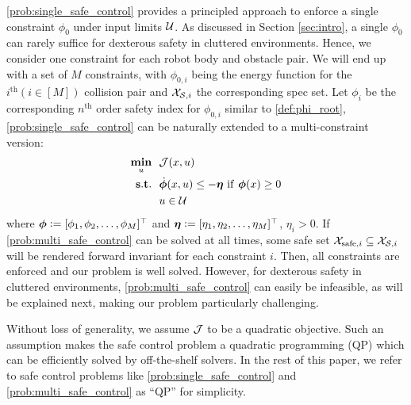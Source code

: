 \eqref{prob:single_safe_control} provides a principled approach to enforce a single constraint $\phi_0$ under input limits $\mathcal{U}$.
As discussed in Section \ref{sec:intro}, a single $\phi_0$ can rarely suffice for dexterous safety in cluttered environments.
Hence, we consider one constraint for each robot body and obstacle pair.
We will end up with a set of $M$ constraints, with $\phi_{0,i}$ being the energy function for the $i^\mathrm{th} (i\in[M])$ collision pair and $\mathcal{X}_{{\mathcal{S}},i}$ the corresponding spec set.
Let $\phi_i$ be the corresponding $n^\mathrm{th}$ order safety index for $\phi_{0,i}$ similar to \eqref{def:phi_root}, \eqref{prob:single_safe_control}
can be naturally extended to a multi-constraint version:
\begin{subequations}\label{prob:multi_safe_control}
\begin{align}
\mathop{\underset{{u}}{\mathop{\mathbf{min}}}}~~ & \mathcal{J}(x,u)  \\
\mathop{\mathbf{s.t.}}~~ & \dot{\bm{\phi}}(x,u) \leq -\bm{\eta}~\mathrm{if}~\bm{\phi}(x) \geq 0  \label{eq:multi_safe_control_phi_constr} \\ 
& u\in\mathcal{U} \label{eq:multi_safe_control_contol_limit}
\end{align}
\end{subequations}
where $\bm{\phi}\vcentcolon=[\phi_1,\phi_2,\dots,\phi_M]^\top$ and $\bm{\eta}\vcentcolon= [\eta_1, \eta_2, \dots, \eta_M]^\top$, $\eta_i > 0$.
If \eqref{prob:multi_safe_control} can be solved at all times, some safe set $\mathcal{X}_{\mathrm{safe},i}\subseteq\mathcal{X}_{{\mathcal{S}},i}$ will be rendered forward invariant for each constraint $i$.
Then, all constraints are enforced and our problem is well solved.
However, for dexterous safety in cluttered environments, \eqref{prob:multi_safe_control} can easily be infeasible, as will be explained next, making our problem particularly challenging.

Without loss of generality, we assume $\mathcal{J}$ to be a quadratic objective.
Such an assumption makes the safe control problem a quadratic programming (QP) which can be efficiently solved by off-the-shelf solvers.
In the rest of this paper, we refer to safe control problems like \eqref{prob:single_safe_control} and \eqref{prob:multi_safe_control} as ``QP'' for simplicity.

